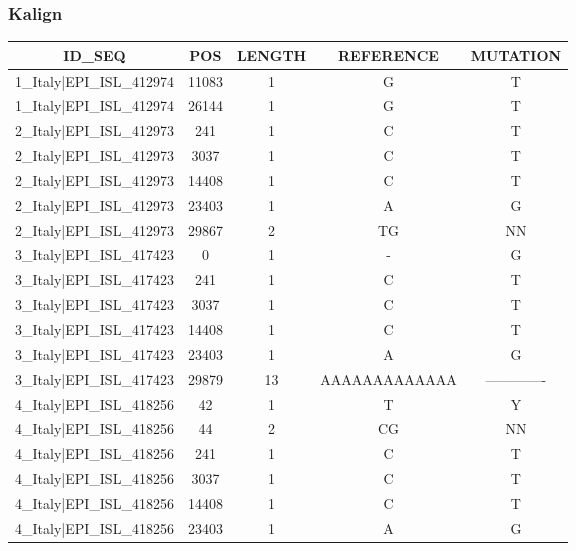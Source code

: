 \documentclass[a4paper,10pt]{article}
\begin{document}
\newpage
\subsubsection{Kalign}

\begin{longtable}{@{}ccccc@{}}
\toprule
\textbf{ID\_SEQ} & \textbf{POS} & \textbf{LENGTH} & \textbf{REFERENCE} & \textbf{MUTATION} \\* \midrule
\endfirsthead
%
\cline{1-5}
\endhead
%
1\_Italy|EPI\_ISL\_412974 & 11083 & 1 & G & T \\* \midrule
1\_Italy|EPI\_ISL\_412974 & 26144 & 1 & G & T \\* \midrule
2\_Italy|EPI\_ISL\_412973 & 241 & 1 & C & T \\* \midrule
2\_Italy|EPI\_ISL\_412973 & 3037 & 1 & C & T \\* \midrule
2\_Italy|EPI\_ISL\_412973 & 14408 & 1 & C & T \\* \midrule
2\_Italy|EPI\_ISL\_412973 & 23403 & 1 & A & G \\* \midrule
2\_Italy|EPI\_ISL\_412973 & 29867 & 2 & TG & NN \\* \midrule
3\_Italy|EPI\_ISL\_417423 & 0 & 1 & - & G \\* \midrule
3\_Italy|EPI\_ISL\_417423 & 241 & 1 & C & T \\* \midrule
3\_Italy|EPI\_ISL\_417423 & 3037 & 1 & C & T \\* \midrule
3\_Italy|EPI\_ISL\_417423 & 14408 & 1 & C & T \\* \midrule
3\_Italy|EPI\_ISL\_417423 & 23403 & 1 & A & G \\* \midrule
3\_Italy|EPI\_ISL\_417423 & 29879 & 13 & AAAAAAAAAAAAA & ------------- \\* \midrule
4\_Italy|EPI\_ISL\_418256 & 42 & 1 & T & Y \\* \midrule
4\_Italy|EPI\_ISL\_418256 & 44 & 2 & CG & NN \\* \midrule
4\_Italy|EPI\_ISL\_418256 & 241 & 1 & C & T \\* \midrule
4\_Italy|EPI\_ISL\_418256 & 3037 & 1 & C & T \\* \midrule
4\_Italy|EPI\_ISL\_418256 & 14408 & 1 & C & T \\* \midrule
4\_Italy|EPI\_ISL\_418256 & 23403 & 1 & A & G \\* \midrule

\end{longtable}
\end{document}
